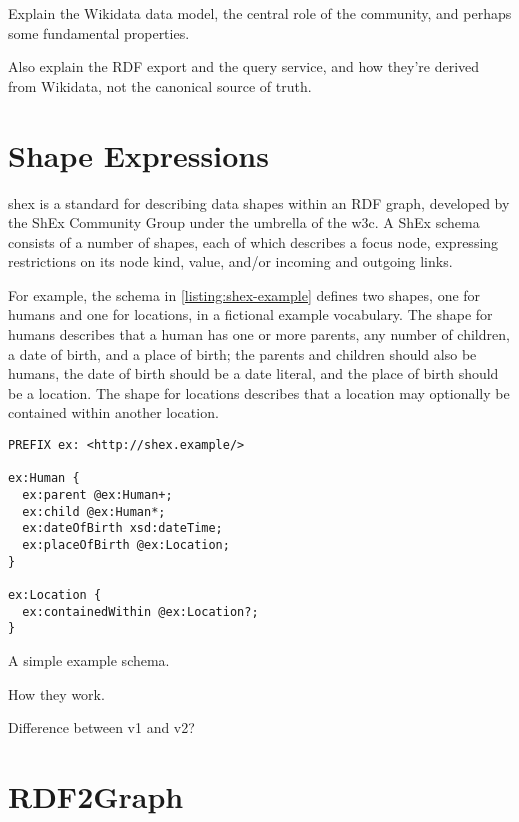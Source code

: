 Explain the Wikidata data model,
the central role of the community,
and perhaps some fundamental properties.

Also explain the RDF export
and the query service,
and how they’re derived from Wikidata,
not the canonical source of truth.


\section{Shape Expressions}
\label{ch:Background:ShEx}

\acrfull{shex} \cite{shex}
is a standard for describing data shapes within an RDF graph,
developed by the ShEx Community Group under the umbrella of the \gls{w3c}.
A ShEx schema consists of a number of shapes,
each of which describes a focus node,
expressing restrictions on its node kind, value, and/or incoming and outgoing links.

For example, the schema in \cref{listing:shex-example} defines two shapes,
one for humans and one for locations,
in a fictional example vocabulary.
The shape for humans describes that a human has one or more parents,
any number of children,
a date of birth,
and a place of birth;
the parents and children should also be humans,
the date of birth should be a date literal,
and the place of birth should be a location.
The shape for locations describes that a location may optionally be contained within another location.

\begin{lstfloat}
\begin{lstlisting}[language=sparql]
PREFIX ex: <http://shex.example/>

ex:Human {
  ex:parent @ex:Human+;
  ex:child @ex:Human*;
  ex:dateOfBirth xsd:dateTime;
  ex:placeOfBirth @ex:Location;
}

ex:Location {
  ex:containedWithin @ex:Location?;
}
\end{lstlisting}
\caption{A simple example schema.}
\label{listing:shex-example}
\end{lstfloat}

How they work.

Difference between v1 and v2?


\section{RDF2Graph}
\label{ch:Background:RDF2Graph}

